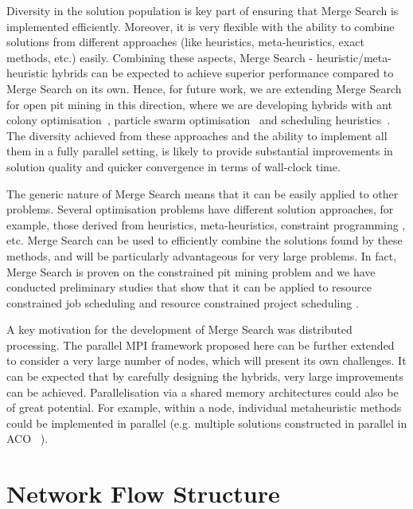 \documentclass[authoryear,11pt,square,number,times,super,comma]{elsarticle}
\begin{document}
Diversity in the solution population is key part of ensuring that Merge Search is implemented efficiently. Moreover, it is very flexible with the ability to combine solutions from different approaches (like heuristics, meta-heuristics, exact methods, etc.) easily. Combining these aspects, Merge Search - heuristic/meta-heuristic hybrids can be expected to achieve superior performance compared to Merge Search on its own. Hence, for future work, we are extending Merge Search for open pit mining in this direction, where we are developing hybrids with  ant colony optimisation~\citep{dorigo04}, particle swarm optimisation~\citep{Kennedy95} and scheduling heuristics~\citep{Thiruvady2013}. The diversity achieved from these approaches and the ability to implement all them in a fully parallel setting, is likely to provide substantial improvements in solution quality and quicker convergence in terms of wall-clock time. 

The generic nature of Merge Search means that it can be easily applied to other problems. Several optimisation problems have different solution approaches, for example, those derived from heuristics, meta-heuristics, constraint programming \citep{marriott98}, etc. Merge Search can be used to efficiently combine the solutions found by these methods, and will be particularly advantageous for very large problems. In fact, Merge Search is proven on the constrained pit mining problem \citep{Kenny:2018} and we have conducted preliminary studies that show that it can be applied to resource constrained job scheduling \citep{singhernst10} and resource constrained project scheduling \citep{kimms00}.

A key motivation for the development of Merge Search was distributed processing. The parallel MPI framework proposed here can be further extended to consider a very large number of nodes, which will present its own challenges. It can be expected that by carefully designing the hybrids, very large improvements can be achieved. Parallelisation via a shared memory architectures could also be of great potential. For example, within a node, individual metaheuristic methods could be implemented in parallel (e.g. multiple solutions constructed in parallel in ACO ~\citep{Thiruvady14a,ernst_hybrid_2010}).  

 
\appendix

\section{Network Flow Structure}\label{sec:network_flow}
\end{document}

